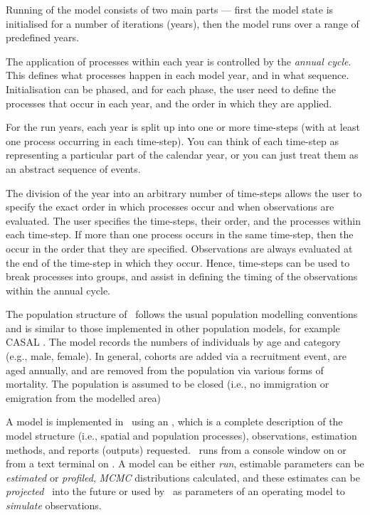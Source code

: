 Running of the model consists of two main parts --- first the model state is initialised for a number of iterations (years), then the model runs over a range of predefined years. 

The application of processes within each year is controlled by the \emph{annual cycle}. This defines what processes happen in each model year, and in what sequence. Initialisation can be phased, and for each phase, the user need to define the processes that occur in each year, and the order in which they are applied. 

For the run years, each year is split up into one or more time-steps (with at least one process occurring in each time-step). You can think of each time-step as representing a particular part of the calendar year, or you can just treat them as an abstract sequence of events.

The division of the year into an arbitrary number of time-steps allows the user to specify the exact order in which processes occur and when observations are evaluated. The user specifies the time-steps, their order, and the processes within each time-step. If more than one process occurs in the same time-step, then the occur in the order that they are specified. Observations are always evaluated at the end of the time-step in which they occur. Hence, time-steps can be used to break processes into groups, and assist in defining the timing of the observations within the annual cycle. 

The population structure of \CNAME\ follows the usual population modelling conventions and is similar to those implemented in other population models, for example CASAL  \citep{1388}. The model records the numbers of individuals by age and category (e.g., male, female). In general, cohorts are added via a recruitment event, are aged annually, and are removed from the population via various forms of mortality. The population is assumed to be closed (i.e., no immigration or emigration from the modelled area)

A model is implemented in \CNAME\ using an \config {}, which is a complete description of the model structure (i.e., spatial and population processes), observations, estimation methods, and reports (outputs) requested. \CNAME\ runs from a console window on  or from a text terminal on . A model can be either \emph{run}, estimable parameters can be \emph{estimated} or \emph{profiled}, \emph{MCMC} distributions calculated, and these estimates can be \emph{projected} \NYI\ into the future or 
used by \CNAME\ as parameters of an operating model to \emph{simulate} observations.

